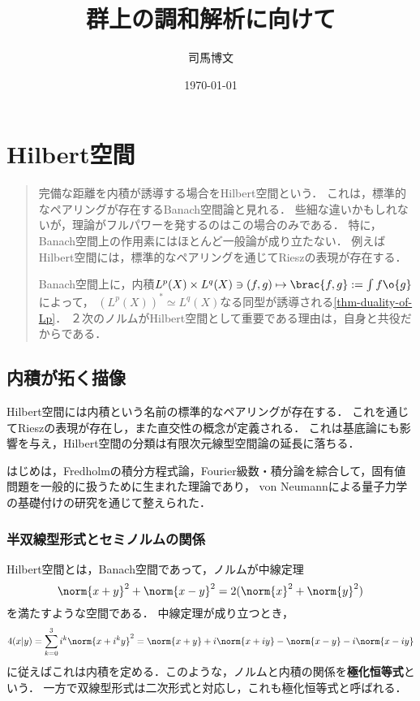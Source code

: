 \documentclass[uplatex,dvipdfmx]{jsreport}
\title{群上の調和解析に向けて}
\author{司馬博文}
\date{\today}
\begin{document}
\tableofcontents

\chapter{Hilbert空間}

\begin{quotation}
    完備な距離を内積が誘導する場合をHilbert空間という．
    これは，標準的なペアリングが存在するBanach空間論と見れる．
    些細な違いかもしれないが，理論がフルパワーを発するのはこの場合のみである．
    特に，Banach空間上の作用素にはほとんど一般論が成り立たない．
    例えばHilbert空間には，標準的なペアリングを通じてRieszの表現が存在する．

    Banach空間上に，内積$L^p(X)\times L^q(X)\ni(f,g)\mapsto\brac{f,g}:=\int f\o{g}$によって，
    $(L^p(X))^*\simeq L^q(X)$なる同型が誘導される\ref{thm-duality-of-Lp}．
    ２次のノルムがHilbert空間として重要である理由は，自身と共役だからである．
\end{quotation}

\section{内積が拓く描像}

\begin{tcolorbox}[colframe=ForestGreen, colback=ForestGreen!10!white,breakable,colbacktitle=ForestGreen!40!white,coltitle=black,fonttitle=\bfseries\sffamily,
title=]
    Hilbert空間には内積という名前の標準的なペアリングが存在する．
    これを通じてRieszの表現が存在し，また直交性の概念が定義される．
    これは基底論にも影響を与え，Hilbert空間の分類は有限次元線型空間論の延長に落ちる．
\end{tcolorbox}

\begin{history}
    はじめは，Fredholmの積分方程式論，Fourier級数・積分論を綜合して，固有値問題を一般的に扱うために生まれた理論であり，
    von Neumannによる量子力学の基礎付けの研究を通じて整えられた．
\end{history}

\subsection{半双線型形式とセミノルムの関係}

\begin{tcolorbox}[colframe=ForestGreen, colback=ForestGreen!10!white,breakable,colbacktitle=ForestGreen!40!white,coltitle=black,fonttitle=\bfseries\sffamily,
title=]
    Hilbert空間とは，Banach空間であって，ノルムが中線定理
    \[\norm{x+y}^2+\norm{x-y}^2=2(\norm{x}^2+\norm{y}^2)\]
    を満たすような空間である．
    中線定理が成り立つとき，
    \[4(x|y)=\sum^3_{k=0}i^k\norm{x+i^ky}^2=\norm{x+y}+i\norm{x+iy}-\norm{x-y}-i\norm{x-iy}\]
    に従えばこれは内積を定める．このような，ノルムと内積の関係を\textbf{極化恒等式}という．
    一方で双線型形式は二次形式と対応し，これも極化恒等式と呼ばれる．
\end{tcolorbox}
\end{document}
